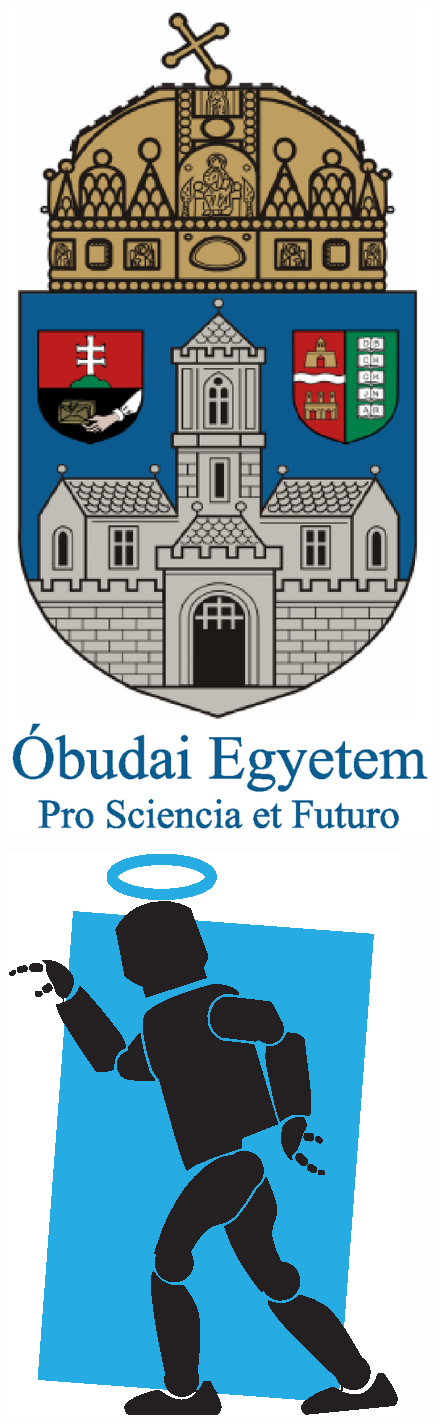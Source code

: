 \documentclass[a4paper,10pt]{article}
\begin{document}
		\begin{figure}
			\centering
			\includegraphics[width=0.7\linewidth]{logos-2}
		\end{figure}
		
			\begin{figure}
				\centering
				\includegraphics[width=0.7\linewidth]{logos-3}
			\end{figure}
			
\end{document}
